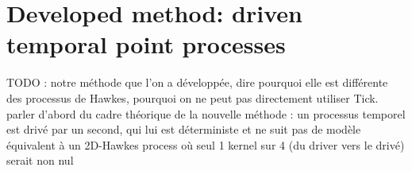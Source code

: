 \section{Developed method: driven temporal point processes}\label{developed_method}

TODO : notre méthode que l'on a développée, dire pourquoi elle est différente des processus de Hawkes, pourquoi on ne peut pas directement utiliser Tick.
parler d'abord du cadre théorique de la nouvelle méthode : un processus temporel est drivé par un second, qui lui est déterministe et ne suit pas de modèle
équivalent à un 2D-Hawkes process où seul 1 kernel sur 4 (du driver vers le drivé) serait non nul








